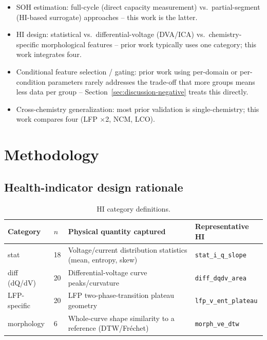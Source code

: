 \documentclass[preprint,12pt]{elsarticle}
\begin{document}
\begin{itemize}
  \item SOH estimation: full-cycle (direct capacity measurement) vs.\ partial-segment (HI-based surrogate) approaches -- this work is the latter.
  \item HI design: statistical vs.\ differential-voltage (DVA/ICA) vs.\ chemistry-specific morphological features -- prior work typically uses one category; this work integrates four.
  \item Conditional feature selection / gating: prior work using per-domain or per-condition parameters rarely addresses the trade-off that more groups means less data per group -- Section~\ref{sec:discussion-negative} treats this directly.
  \item Cross-chemistry generalization: most prior validation is single-chemistry; this work compares four (LFP $\times$2, NCM, LCO).
\end{itemize}

\section{Methodology}

\subsection{Health-indicator design rationale}
\label{sec:hi-design}

\begin{table}[htbp]
  \centering
  \caption{HI category definitions.}
  \label{tab:hi-categories}
  \begin{tabular}{@{}llll@{}}
    \toprule
    Category & $n$ & Physical quantity captured & Representative HI \\
    \midrule
    stat & 18 & Voltage/current distribution statistics (mean, entropy, skew) & \texttt{stat\_i\_q\_slope} \\
    diff (dQ/dV) & 20 & Differential-voltage curve peaks/curvature & \texttt{diff\_dqdv\_area} \\
    LFP-specific & 20 & LFP two-phase-transition plateau geometry & \texttt{lfp\_v\_ent\_plateau} \\
    morphology & 6 & Whole-curve shape similarity to a reference (DTW/Fr\'{e}chet) & \texttt{morph\_ve\_dtw} \\
    \bottomrule
  \end{tabular}
\end{table}
\end{document}
